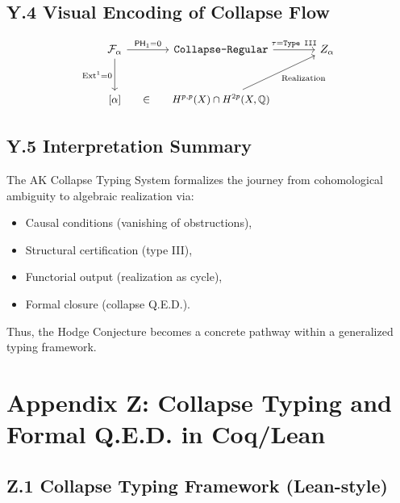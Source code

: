 \documentclass[11pt]{article}
\DeclareMathOperator{\Ext}{Ext}
\begin{document}
\subsection*{Y.4 Visual Encoding of Collapse Flow}

\[
\begin{tikzcd}[row sep=large, column sep=large]
\mathcal{F}_\alpha 
  \arrow[r, "\mathsf{PH}_1 = 0"] 
  \arrow[d, swap, "\Ext^1 = 0"]
& \texttt{Collapse-Regular} 
  \arrow[r, "\tau = \texttt{Type III}"]
& |[alias=Z]| Z_\alpha \\
%
{\text{\small$[\alpha]$}} 
  \arrow[r, phantom, "{\in}"]
& {\text{\small$H^{p,p}(X) \cap H^{2p}(X, \mathbb{Q})$}} 
  \arrow[to=Z, swap, "\text{Realization}"]
\end{tikzcd}
\]


\subsection*{Y.5 Interpretation Summary}

The AK Collapse Typing System formalizes the journey from cohomological ambiguity to algebraic realization via:

\begin{itemize}
  \item Causal conditions (vanishing of obstructions),
  \item Structural certification (type III),
  \item Functorial output (realization as cycle),
  \item Formal closure (collapse Q.E.D.).
\end{itemize}

Thus, the Hodge Conjecture becomes a concrete pathway within a generalized typing framework.



\section*{Appendix Z: Collapse Typing and Formal Q.E.D. in Coq/Lean}


\subsection*{Z.1 Collapse Typing Framework (Lean-style)}
\end{document}
